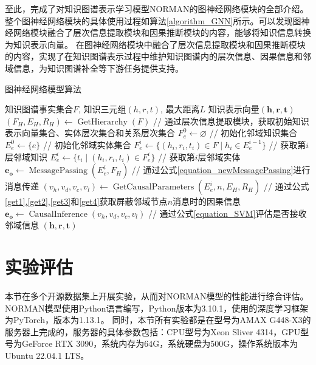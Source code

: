 \documentclass[algorithmlist, AutoFakeBold, AutoFakeSlant, figurelist, tablelist, nomlist, engineering]{seuthesix}
\begin{document}
至此，完成了对知识图谱表示学习模型NORMAN的图神经网络模块的全部介绍。
整个图神经网络模块的具体使用过程如算法\ref{algorithm_GNN}所示。可以发现图神经网络模块融合了层次信息提取模块和因果推断模块的内容，能够将知识信息转换为知识表示向量。
在图神经网络模块中融合了层次信息提取模块和因果推断模块的内容，实现了在知识图谱表示过程中维护知识图谱内的层次信息、因果信息和邻域信息，为知识图谱补全等下游任务提供支持。
\begin{algorithm}[H]
	\caption{图神经网络模型算法}  
	\label{algorithm_GNN}
	\begin{algorithmic}[1]
  \Require 知识图谱事实集合$F$, 知识三元组$(h, r, t)$, 最大距离$L$
  \Ensure 知识表示向量$(\bm{h}, \bm{r}, \bm{t})$
  \State $(F_H, E_H, R_H) \leftarrow \operatorname{GetHierarchy}(F)$ // 通过层次信息提取模块，获取初始知识表示向量集合、实体层次集合和关系层次集合
  \State $F_{e}^{0} \leftarrow \varnothing$ // 初始化邻域知识集合
  \State $E_{e}^{0} \leftarrow \{e\}$ // 初始化邻域实体集合
  \State $F_{e}^{i} \leftarrow \{(h_i, r_i, t_i) \in F \mid h_i \in E_{e}^{i-1}\}$ // 获取第$i$层邻域知识
  \State $E_{e}^{i} \leftarrow \{t_i \mid (h_i, r_i, t_i) \in F_{e}^{i}\}$ // 获取第$i$层邻域实体
  \State $\bm{e_o} \leftarrow \operatorname{MessagePassing}(E_{e}^{i}, F_H)$ // 通过公式\ref{equation_newMessagePassing}进行消息传递
  \State $(v_h, v_d, v_c, v_l) \leftarrow \operatorname{GetCausalParameters}(E_{e}^{i}, n, E_H, R_H)$ 
  \State // 通过公式\ref{get1},\ref{get2},\ref{get3}和\ref{get4}获取屏蔽邻域节点$n$消息时的因果信息
  \State $\bm{e_o} \leftarrow \operatorname{CausalInference}(v_h, v_d, v_c, v_l)$ // 通过公式\ref{equation_SVM}评估是否接收邻域信息
  \EndFor
  \EndFor
  \EndFor
  \State \Return $(\bm{h}, \bm{r}, \bm{t})$
	\end{algorithmic}
\end{algorithm} 


\section{实验评估}
本节在多个开源数据集上开展实验，从而对NORMAN模型的性能进行综合评估。
NORMAN模型使用Python语言编写，Python版本为3.10.1，使用的深度学习框架为PyTorch，版本为1.13.1。
同时，本节所有实验都是在型号为AMAX G448-X3的服务器上完成的，服务器的具体参数包括：CPU型号为Xeon Sliver 4314，GPU型号为GeForce RTX 3090，系统内存为64G，系统硬盘为500G，操作系统版本为Ubuntu 22.04.1 LTS。
\end{document}
